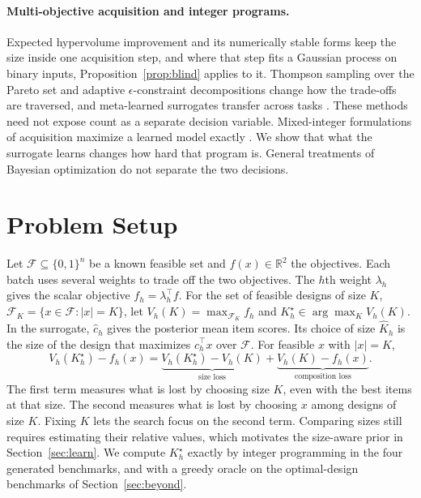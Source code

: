 \documentclass{article}
\newcommand{\revtext}[1]{{\color{blue}#1}}
\providecommand{\F}{\mathcal F}
\theoremstyle{remark}\newtheorem{remark}[proposition]{Remark}
\begin{document}
\paragraph{Multi-objective acquisition and integer programs.}
Expected hypervolume improvement and its numerically stable forms
\citep{daulton2021parallel,ament2023unexpected} keep the size inside one acquisition step,
and where that step fits a Gaussian process on binary inputs,
Proposition~\ref{prop:blind} applies to it. Thompson sampling over the Pareto set
\citep{33523504fb214ab4be9971ced3b8e9e0} and adaptive $\epsilon$-constraint decompositions
\citep{yang2026multiobjective} change how the trade-offs are traversed, and meta-learned
surrogates transfer across tasks \citep{pmlr-v235-pan24b,watanabe2023metamotpe}.
\revtext{These methods need not expose count as a separate decision variable.} Mixed-integer formulations of
acquisition maximize a learned model exactly
\citep{papalexopoulos2022constrained}. We show that what the surrogate learns changes
how hard that program is. General treatments of Bayesian optimization
\citep{shahriari2015taking,garnett2023bayesian} do not separate the two decisions.

\section{Problem Setup}\label{sec:setup}

Let $\F\subseteq\{0,1\}^n$ be a known feasible set and $f(x)\in\mathbb R^2$ the
objectives. \revtext{Each batch uses several weights to trade off the two objectives. The $h$th weight $\lambda_h$ gives the scalar objective $f_h=\lambda_h^\top f$}. For the
\revtext{set of feasible designs of size $K$, $\F_K=\{x\in\F:|x|=K\}$,} let $V_h(K)=\max_{\F_K}f_h$ and
$K^\star_h\in\arg\max_K V_h(K)$. \revtext{In the surrogate, $\hat c_h$ gives the posterior mean item scores. Its choice of size $\hat K_h$ is the size of the design that maximizes $\hat c_h^\top x$ over $\F$.} For feasible $x$ with $|x|=K$,
\begin{equation}\label{eq:decomp}
V_h(K^\star_h)-f_h(x)=\underbrace{V_h(K^\star_h)-V_h(K)}_{\text{size loss}}
+\underbrace{V_h(K)-f_h(x)}_{\text{composition loss}} .
\end{equation}
\revtext{The first term measures what is lost by choosing size $K$, even with the best items at that size. The second measures what is lost by choosing $x$ among designs of size $K$. Fixing $K$ lets the search focus on the second term. Comparing sizes still requires estimating their relative values, which motivates the size-aware prior in Section~\ref{sec:learn}.}
We compute $K^\star_h$ exactly by integer programming in the four generated benchmarks, and with a greedy oracle on the optimal-design benchmarks of Section~\ref{sec:beyond}.
\end{document}
